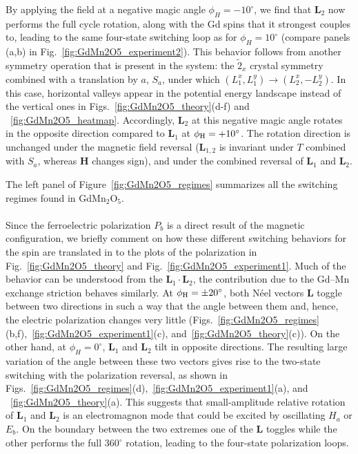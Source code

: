 By applying the field at a negative magic angle $\phi_H = -10^\circ$, we find that $\bm L_2$ now performs the full cycle rotation, along with the Gd spins that it strongest couples to, leading to the same four-state switching loop as for $\phi_H = 10^\circ$ (compare panels (a,b) in Fig.~\ref{fig:GdMn2O5_experiment2}).
This behavior follows from another symmetry operation that is present in the system: the $\tilde{2}_x$ crystal symmetry combined with a translation by $a$, $S_a$, under which $(L_1^x,L_1^y) \rightarrow (L_2^x,-L_2^y)$.
In this case, horizontal valleys appear in the potential energy landscape instead of the vertical ones in Figs.~\ref{fig:GdMn2O5_theory}(d-f) and ~\ref{fig:GdMn2O5_heatmap}.
Accordingly, $\bm{L}_2$ at this negative magic angle rotates in the opposite direction compared to  $\bm{L}_1$ at $\phi_{\rm H} = +10^\circ$.
The rotation direction is unchanged under the magnetic field reversal ($\bm{L}_{1,2}$ is invariant under $T$ combined with $S_a$, whereas $\bm{H}$ changes sign), and under the combined reversal of $\bm{L}_{1}$ and $\bm{L}_{2}$.

The left panel of Figure~\ref{fig:GdMn2O5_regimes} summarizes all the switching regimes found in GdMn$_2$O$_5$.
\\\\
%
Since the ferroelectric polarization $P_b$ is a direct result of the magnetic configuration, we briefly comment on how these different switching behaviors for the spin are translated in to the plots of the polarization in Fig.~\ref{fig:GdMn2O5_theory} and Fig.~\ref{fig:GdMn2O5_experiment1}.
Much of the behavior can be understood from the $\bm L_1 \cdot \bm L_2$, the contribution due to the Gd--Mn exchange striction behaves similarly.
At $\phi_{\rm H} = \pm 20^\circ$, both N\'eel vectors $\bm L$ toggle between two directions in such a way that the angle between them and, hence, the electric polarization changes very little (Figs.~\ref{fig:GdMn2O5_regimes}(b,f),~\ref{fig:GdMn2O5_experiment1}(c), and~\ref{fig:GdMn2O5_theory}(c)). 
On the other hand, at $\phi_{H}=0^\circ$, $\bm{L}_1$ and  $\bm{L}_2$ tilt in opposite directions. The resulting large variation of the angle between these two vectors gives rise to the two-state switching with the polarization reversal, as shown in Figs.~\ref{fig:GdMn2O5_regimes}(d),~\ref{fig:GdMn2O5_experiment1}(a), and ~\ref{fig:GdMn2O5_theory}(a). This suggests that small-amplitude relative rotation of $\bm{L}_1$ and $\bm{L}_2$ is an electromagnon mode that could be excited by oscillating $H_a$ or $E_b$.
On the boundary between the two extremes one of the $\bm L$ toggles while the other performs the full 360$^\circ$ rotation, leading to the four-state polarization loops.
%
%
